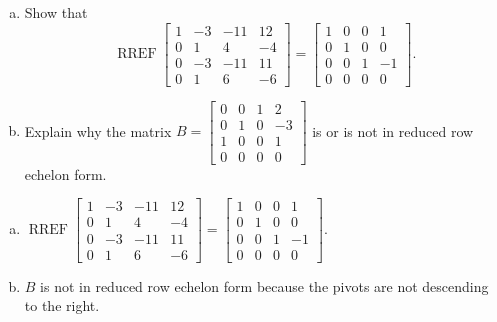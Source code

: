 
\begin{exerciseStatement}

\begin{enumerate}[(a)]
\item Show that \[\operatorname{RREF} \left[\begin{array}{cccc}
1 & -3 & -11 & 12 \\
0 & 1 & 4 & -4 \\
0 & -3 & -11 & 11 \\
0 & 1 & 6 & -6
\end{array}\right] = \left[\begin{array}{cccc}
1 & 0 & 0 & 1 \\
0 & 1 & 0 & 0 \\
0 & 0 & 1 & -1 \\
0 & 0 & 0 & 0
\end{array}\right] .\]
\item Explain why the matrix \(B= \left[\begin{array}{cccc}
0 & 0 & 1 & 2 \\
0 & 1 & 0 & -3 \\
1 & 0 & 0 & 1 \\
0 & 0 & 0 & 0
\end{array}\right] \) is or is not in reduced row echelon form.
\end{enumerate}
    
\end{exerciseStatement}
    
\begin{exerciseAnswer} 

\begin{enumerate}[(a)]
\item \(\operatorname{RREF} \left[\begin{array}{cccc}
1 & -3 & -11 & 12 \\
0 & 1 & 4 & -4 \\
0 & -3 & -11 & 11 \\
0 & 1 & 6 & -6
\end{array}\right] = \left[\begin{array}{cccc}
1 & 0 & 0 & 1 \\
0 & 1 & 0 & 0 \\
0 & 0 & 1 & -1 \\
0 & 0 & 0 & 0
\end{array}\right] .\)
\item \(B\) is not in reduced row echelon form because the pivots are not descending to the right. 
\end{enumerate}
    
\end{exerciseAnswer}
    

